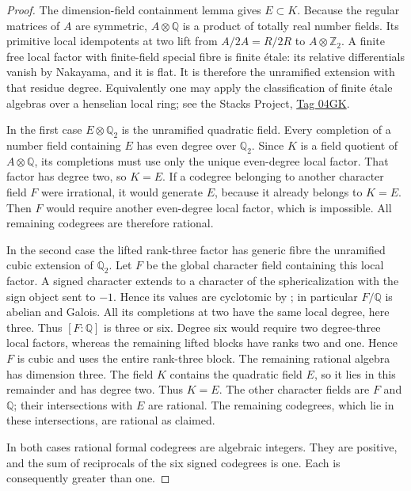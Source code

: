 \begin{proof}
The dimension-field containment lemma gives $E\subset K$.
Because the regular matrices of $A$ are symmetric, $A\otimes\mathbb Q$
is a product of totally real number fields. Its primitive local
idempotents at two lift from $A/2A=R/2R$ to $A\otimes\mathbb Z_2$.
A finite free local factor with finite-field special fibre is finite
\'etale: its relative differentials vanish by Nakayama, and it is
flat. It is therefore the unramified extension with that residue
degree. Equivalently one may apply the classification of finite
\'etale algebras over a henselian local ring; see the Stacks Project,
\href{https://stacks.math.columbia.edu/tag/04GK}{Tag 04GK}.

In the first case $E\otimes\mathbb Q_2$ is the unramified quadratic
field. Every completion of a number field containing $E$ has even
degree over $\mathbb Q_2$. Since $K$ is a field quotient of
$A\otimes\mathbb Q$, its completions must use only the unique
even-degree local factor. That factor has degree two, so $K=E$.
If a codegree belonging to another character field $F$ were
irrational, it would generate $E$, because it already belongs to
$K=E$. Then $F$ would require another even-degree local factor,
which is impossible. All remaining codegrees are therefore rational.

In the second case the lifted rank-three factor has generic fibre
the unramified cubic extension of $\mathbb Q_2$. Let $F$ be the
global character field containing this local factor. A signed
character extends to a character of the sphericalization with
the sign object sent to $-1$. Hence its values are cyclotomic by
\cite[Theorem~8.51]{ENO}; in particular $F/\mathbb Q$ is abelian
and Galois. All its completions at two have the same local degree,
here three. Thus $[F:\mathbb Q]$ is three or six. Degree six would
require two degree-three local factors, whereas the remaining
lifted blocks have ranks two and one. Hence $F$ is cubic and uses
the entire rank-three block. The remaining rational algebra has
dimension three. The field $K$ contains the quadratic field $E$,
so it lies in this remainder and has degree two. Thus $K=E$.
The other character fields are $F$ and $\mathbb Q$; their
intersections with $E$ are rational. The remaining codegrees,
which lie in these intersections, are rational as claimed.

In both cases rational formal codegrees are algebraic integers.
They are positive, and the sum of reciprocals of the six signed
codegrees is one. Each is consequently greater than one.
\end{proof}

